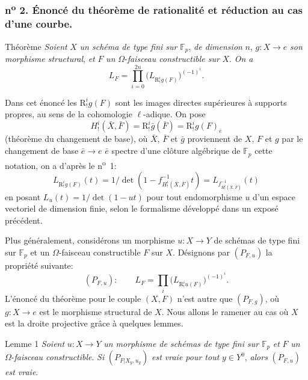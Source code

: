 \subsubsection*{n\textsuperscript{o} 2. Énoncé du théorème de rationalité et réduction au cas d'une courbe.}

\begin{statement}{Théorème}
\emph{Soient} $X$ \emph{un schéma de type fini sur} $\mathbb{F}_p$, \emph{de dimension} $n$, $g:X\to e$ \emph{son morphisme structural}, \emph{et} $F$ \emph{un} $\Omega$-\emph{faisceau constructible sur} $X$. \emph{On a}
\[
L_F=\prod_{i=0}^{2n}\bigl(L_{\mathrm{R}^i_!g(F)}\bigr)^{(-1)^i}.
\tag{1}
\]
\end{statement}

Dans cet énoncé les $\mathrm{R}^i_!g(F)$ sont les images directes supérieures à supports propres, au sens de la cohomologie $\ell$-adique. On pose
\[
H^i_!(\bar X,\bar F)=\mathrm{R}^i_!\bar g(\bar F)=\mathrm{R}^i_!g(F)_{\bar e}
\]
(théorème du changement de base), où 
$\bar X$, $\bar F$ et $\bar g$
proviennent de $X$, $F$ et $g$ par le changement de base $\bar e\to e$ $\bar e$  spectre d'une clôture algébrique de $\mathbb{F}_p$  cette notation, on a d'après le n\textsuperscript{o}~1:
\[
L_{\mathrm{R}^i_!g(F)}(t)=1/\det(1-f^{-1}_{H^i_!(\bar X,\bar F)}t)
 =L_{f^{-1}_{H^i_!(\bar X,\bar F)}}(t)
\]
en posant $L_u(t)=1/\det(1-ut)$ pour tout endomorphisme $u$ d'un espace vectoriel de dimension finie, selon le formalisme développé dans un exposé précédent.

Plus généralement, considérons un morphisme $u:X\to Y$ de schémas de type fini sur $\mathbb{F}_p$ et un $\Omega$-faisceau constructible $F$ sur $X$. Désignons par $(P_{F,u})$ la propriété suivante:
\[
(P_{F,u}):\qquad
L_F=\prod_i\bigl(L_{\mathrm{R}^i_!u(F)}\bigr)^{(-1)^i}.
\]
L'énoncé du théorème pour le couple $(X,F)$ n'est autre que $(P_{F,g})$, où $g:X\to e$ est le morphisme structural de $X$. Nous allons le ramener au cas où $X$ est la droite projective grâce à quelques lemmes.

\begin{statement}{Lemme 1}
\emph{Soient} $u:X\to Y$ \emph{un morphisme de schémas de type fini sur} $\mathbb{F}_p$ \emph{et} $F$ \emph{un} $\Omega$-\emph{faisceau constructible}. \emph{Si} $(P_{F|X_y,u_y})$ \emph{est vraie pour tout} $y\in Y^0$, \emph{alors} $(P_{F,u})$ \emph{est vraie}.
\end{statement}

